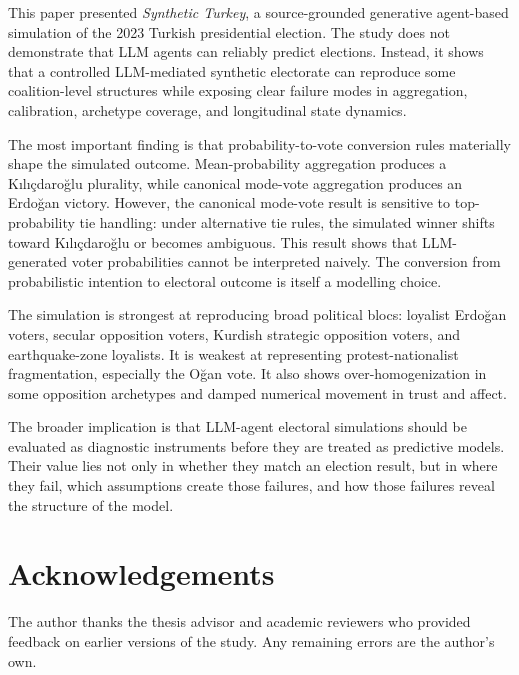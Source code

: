 \documentclass[pdflatex,sn-mathphys-num,iicol]{sn-jnl}
\begin{document}
This paper presented \textit{Synthetic Turkey}, a source-grounded generative
agent-based simulation of the 2023 Turkish presidential election. The study does
not demonstrate that LLM agents can reliably predict elections. Instead, it
shows that a controlled LLM-mediated synthetic electorate can reproduce some
coalition-level structures while exposing clear failure modes in aggregation,
calibration, archetype coverage, and longitudinal state dynamics.

The most important finding is that probability-to-vote conversion rules
materially shape the simulated outcome. Mean-probability aggregation produces a
Kılıçdaroğlu plurality, while canonical mode-vote aggregation produces an
Erdoğan victory. However, the canonical mode-vote result is sensitive to
top-probability tie handling: under alternative tie rules, the simulated winner
shifts toward Kılıçdaroğlu or becomes ambiguous. This result shows that
LLM-generated voter probabilities cannot be interpreted naively. The conversion
from probabilistic intention to electoral outcome is itself a modelling choice.

The simulation is strongest at reproducing broad political blocs: loyalist
Erdoğan voters, secular opposition voters, Kurdish strategic opposition voters,
and earthquake-zone loyalists. It is weakest at representing protest-nationalist
fragmentation, especially the Oğan vote. It also shows over-homogenization in
some opposition archetypes and damped numerical movement in trust and affect.

The broader implication is that LLM-agent electoral simulations should be
evaluated as diagnostic instruments before they are treated as predictive
models. Their value lies not only in whether they match an election result, but
in where they fail, which assumptions create those failures, and how those
failures reveal the structure of the model.


\section*{Acknowledgements}

The author thanks the thesis advisor and academic reviewers who provided
feedback on earlier versions of the study. Any remaining errors are the
author's own.


\end{document}
